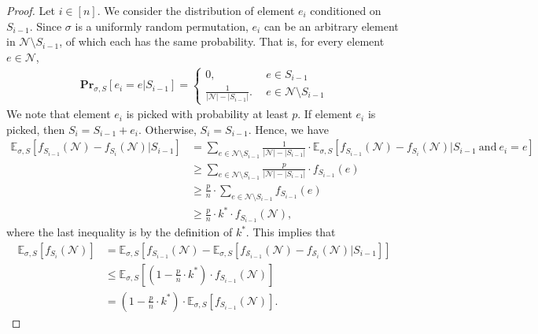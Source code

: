 \documentclass[11pt]{article}
\theoremstyle{definition}
\begin{document}
\begin{proof}
    Let $i\in [n]$. We consider the distribution of element $e_i$ conditioned on $S_{i-1}$. Since $\sigma$ is a uniformly random permutation, $e_i$ can be an arbitrary element in $\mathcal{N}\setminus S_{i-1}$, of which each has the same probability. That is, for every element $e\in \mathcal{N}$,
    $$\begin{aligned}
        \mathbf{Pr}_{\sigma, S}[e_i=e|S_{i-1}] = 
        \begin{cases}
            0, \ \ & e\in S_{i-1} \\
            \frac{1}{|\mathcal{N}|-|S_{i-1}|}. \ \ & e\in \mathcal{N}\setminus S_{i-1}
        \end{cases}
    \end{aligned}$$
    We note that element $e_i$ is picked with probability at least $p$. If element $e_i$ is picked, then $S_i=S_{i-1}+e_i$. Otherwise, $S_i=S_{i-1}$. Hence, we have
    $$\begin{aligned}
        \mathbb{E}_{\sigma, S}[f_{S_{i-1}}(\mathcal{N})-f_{S_i}(\mathcal{N}) | S_{i-1}] &= \sum_{e\in \mathcal{N}\setminus S_{i-1}} \frac{1}{|\mathcal{N}|-|S_{i-1}|} \cdot \mathbb{E}_{\sigma, S}[f_{S_{i-1}}(\mathcal{N})-f_{S_i}(\mathcal{N}) | S_{i-1} \ \text{and} \ e_i=e] \\
        &\geq \sum_{e\in \mathcal{N}\setminus S_{i-1}} \frac{p}{|\mathcal{N}|-|S_{i-1}|} \cdot f_{S_{i-1}}(e) \\
        &\geq \frac{p}{n}\cdot \sum_{e\in \mathcal{N}\setminus S_{i-1}}f_{S_{i-1}}(e) \\
        &\geq \frac{p}{n}\cdot k^*\cdot f_{S_{i-1}}(\mathcal{N}),
    \end{aligned}$$
    where the last inequality is by the definition of $k^*$. This implies that
    $$\begin{aligned}
        \mathbb{E}_{\sigma, S}[f_{S_{i}}(\mathcal{N})] &= \mathbb{E}_{\sigma, S}[f_{S_{i-1}}(\mathcal{N})-\mathbb{E}_{\sigma, S}[f_{\mathcal{S}_{i-1}}(\mathcal{N})-f_{\mathcal{S}_i}(\mathcal{N})| S_{i-1}]] \\
        &\leq \mathbb{E}_{\sigma, S}\left[\left(1-\frac{p}{n}\cdot k^*\right)\cdot f_{S_{i-1}}(\mathcal{N})\right]\\
        &= \left(1-\frac{p}{n}\cdot k^*\right)\cdot \mathbb{E}_{\sigma, S}[f_{S_{i-1}}(\mathcal{N})].
    \end{aligned}$$


\end{proof}
\end{document}
